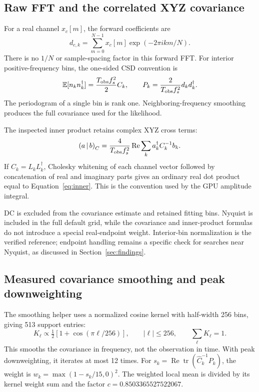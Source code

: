 \documentclass[11pt,a4paper]{article}
\newcommand{\ip}[2]{\left(#1\,\middle|\,#2\right)}
\begin{document}
\subsection{Raw FFT and the correlated XYZ covariance}

For a real channel \(x_c[m]\), the forward coefficients are
\[
d_{c,k}=\sum_{m=0}^{N-1}x_c[m]\exp(-2\pi i km/N).
\]
There is no \(1/N\) or sample-spacing factor in this forward FFT. For interior
positive-frequency bins, the one-sided CSD convention is
\begin{equation}
\mathbb E[n_k n_k^\dagger]=\frac{T_{\rm obs}f_s^2}{2}C_k,
\qquad
P_k=\frac{2}{T_{\rm obs}f_s^2}d_kd_k^\dagger.
\label{eq:rawcov}
\end{equation}
The periodogram of a single bin is rank one. Neighboring-frequency smoothing
produces the full covariance used for the likelihood.

The inspected inner product retains complex XYZ cross terms:
\begin{equation}
\ip{a}{b}_C=\frac{4}{T_{\rm obs}f_s^2}
       \operatorname{Re}\sum_k a_k^\dagger C_k^{-1}b_k.
\label{eq:inner}
\end{equation}
If \(C_k=L_kL_k^\dagger\), Cholesky whitening of each channel vector followed by
concatenation of real and imaginary parts gives an ordinary real dot product
equal to Equation~\eqref{eq:inner}. This is the convention used by the GPU
amplitude integral.

DC is excluded from the covariance estimate and retained fitting bins.
Nyquist is included in the full default grid, while the covariance and
inner-product formulas do not introduce a special real-endpoint weight.
Interior-bin normalization is the verified reference; endpoint handling remains
a specific check for searches near Nyquist, as discussed in Section~\ref{sec:findings}.

\subsection{Measured covariance smoothing and peak downweighting}

The smoothing helper uses a normalized cosine kernel with half-width 256 bins,
giving 513 support entries:
\[
K_\ell\propto\tfrac12[1+\cos(\pi\ell/256)],\qquad
|\ell|\leq256,\qquad \sum_\ell K_\ell=1.
\]
This smooths the covariance in frequency, not the observation in time.
With peak downweighting, it iterates at most 12 times. For
\(s_k=\operatorname{Re}\operatorname{tr}(\widehat C_k^{-1}P_k)\), the weight is
\(w_k=\max(1-s_k/15,0)^2\). The weighted local mean is divided by its kernel
weight sum and the factor \(c=0.8503365527522067\).
\end{document}
